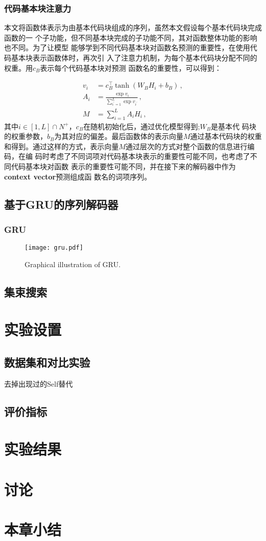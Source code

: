 \subsubsection{\textbf{代码基本块注意力}}
本文将函数体表示为由基本代码块组成的序列，虽然本文假设每个基本代码块完成函数的一
个子功能，但不同基本块完成的子功能不同，其对函数整体功能的影响也不同。为了让模型
能够学到不同代码基本块对函数名预测的重要性，在使用代码基本块表示函数体时，再次引
入了注意力机制，为每个基本代码块分配不同的权重。用$c_B$表示每个代码基本块对预测
函数名的重要性，可以得到：

\begin{align}
v_i &= c_B^\top \tanh(W_B H_i + b_B) \,, \\
A_i &= \frac{\exp{v_i}}{\sum_{i^\prime=1}^{L} \exp{v_{i^\prime}}} 
\,, \\
M &= \sum_{i=1}^{L} A_i H_i \,,
\end{align}
\label{eq:block_attn}
其中$i\in [1, L] \cap N^+$，$c_B$在随机初始化后，通过优化模型得到;$W_B$是基本代
码块的权重参数，$b_B$为其对应的偏差。最后函数体的表示向量$M$通过基本代码块的权重
和得到。通过这样的方式，表示向量$M$通过层次的方式对整个函数的信息进行编码，在编
码时考虑了不同词项对代码基本块表示的重要性可能不同，也考虑了不同代码基本块对函数
表示的重要性可能不同，并在接下来的解码器中作为\textbf{context vector}预测组成函
数名的词项序列。

\subsection{基于GRU的序列解码器}
\subsubsection{GRU}

\begin{figure} [!t]
	\centering
	\texttt{[image: gru.pdf]}
	\caption{Graphical illustration of GRU.}
	\label{fig:gru}
\end{figure}
\subsection{集束搜索}
\section{实验设置}
\subsection{数据集和对比实验}
去掉出现过的Self替代

\subsection{评价指标}
\section{实验结果}
\section{讨论}
\section{本章小结}
